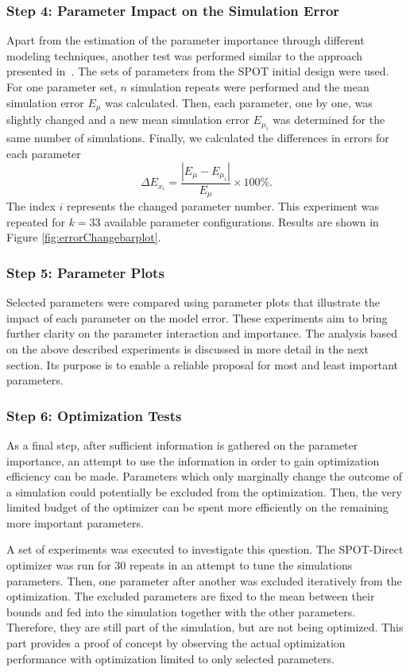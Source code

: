 \documentclass[conference]{IEEEtran}
\begin{document}
\subsubsection*{Step 4: Parameter Impact on the Simulation Error}
Apart from the estimation of the parameter importance through different  modeling techniques, another test was performed similar to the approach presented in~\cite{Ahmed20}. 
The sets of parameters from the \gls{SPOT} initial design were used.
For one parameter set, $n$ simulation repeats were performed and the mean simulation error $E_{\mu}$ was calculated.
Then, each parameter, one by one, was slightly changed and a new mean simulation error $E_{\mu_i}$ was determined for the same number of simulations.  
Finally, we calculated the differences in errors for each parameter 
\begin{equation}\label{eq:delta}
\Delta E_{x_i} =  \frac{|E_{\mu}-E_{\mu_i}|}{E_{\mu}}\times 100 \%.
\end{equation}
The index $i$ represents the changed parameter number. 
This experiment was repeated for $k=33$ available parameter configurations. 
Results are shown in Figure \ref{fig:errorChangebarplot}.

\subsubsection*{Step 5: Parameter Plots}
Selected parameters were compared using parameter plots
that illustrate the impact of each parameter on the model error. 
These experiments aim to bring further clarity on the parameter interaction and importance.
The analysis based on the above described experiments is discussed in more detail in the next section. 
Its purpose is to enable a reliable proposal for most and least important parameters.

\subsubsection*{Step 6: Optimization Tests}\label{sec:optimTests}
As a final step, after sufficient information is gathered on the parameter importance, 
an attempt to use the information in order to gain optimization efficiency can be made. 
Parameters which only marginally change the outcome of a simulation could potentially be excluded from the optimization. 
Then, the very limited budget of the optimizer can be spent more efficiently on the remaining more important parameters. 

A set of experiments was executed to investigate this question.
The SPOT-Direct optimizer was run for 30 repeats in an attempt to tune the simulations parameters.
Then, one parameter after another was excluded iteratively from the optimization.
The excluded parameters are fixed to the mean between their bounds and fed into the simulation together with the other parameters.
Therefore, they are still part of the simulation, but are not being optimized.
This part provides a proof of concept by observing the actual optimization performance with optimization limited to only selected parameters. 
\end{document}
